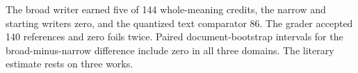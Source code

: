 \par The broad writer earned five of 144 whole-meaning credits, the narrow and starting writers zero, and the quantized text comparator 86. The grader accepted 140 references and zero foils twice. Paired document-bootstrap intervals for the broad-minus-narrow difference include zero in all three domains. The literary estimate rests on three works.
